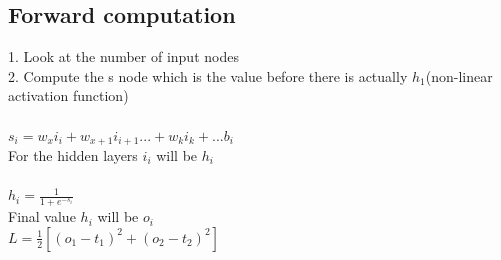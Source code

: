 \documentclass[11pt]{article}
\begin{document}
\begin{multicols*}{4}
\setlength{\columnsep}{1cm}
\subsection*{Forward computation}
1. Look at the number of input nodes\\
2. Compute the s node which is the value before there is actually $h_{1}$(non-linear activation function)\\\\
$s_{i} = w_{x}i_{i} + w_{x+1}i_{i+1} ... + w_{k}i_{k} + ... b_{i}$\\
For the hidden layers $i_{i}$ will be $h_{i}$\\\\
$h_{i} = \frac{1}{1 + e^{-s_{i}}}$\\
Final value $h_{i}$ will be $o_{i}$\\
$L = \frac{1}{2} [(o_{1} - t_{1})^2 +  (o_{2} - t_{2})^2]$\\

\end{multicols*}
\end{document}
